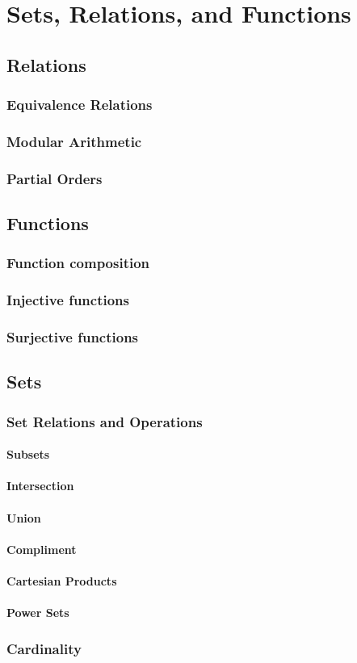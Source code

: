 \chapter{Sets, Relations, and Functions}

\section{Relations}
\subsection{Equivalence Relations}
\subsection{Modular Arithmetic}
\subsection{Partial Orders}

\section{Functions}
\subsection{Function composition}
\subsection{Injective functions}
\subsection{Surjective functions}


\section{Sets}
\subsection{Set Relations and Operations}
\subsubsection{Subsets}
\subsubsection{Intersection}
\subsubsection{Union}
\subsubsection{Compliment}
\subsubsection{Cartesian Products}
\subsubsection{Power Sets}
\subsection{Cardinality}